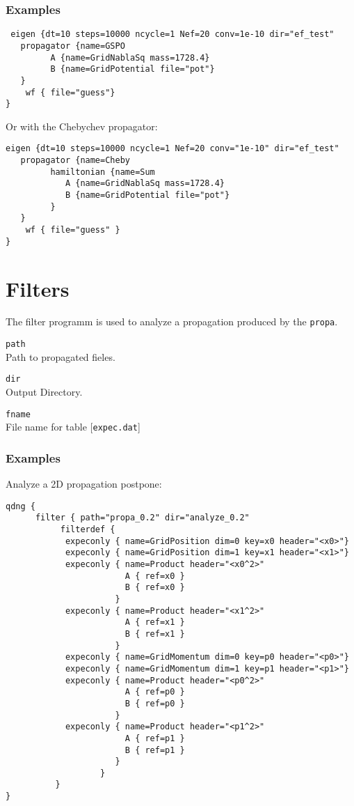 \documentclass[a4paper,12pt]{scrbook}
\newcommand{\option}[2]{\item \texttt{#1}\\ #2}
\newcommand{\code}[1]{\texttt{#1}}
\begin{document}
\subsubsection*{Examples}
\begin{verbatim}
 eigen {dt=10 steps=10000 ncycle=1 Nef=20 conv=1e-10 dir="ef_test"
   propagator {name=GSPO
         A {name=GridNablaSq mass=1728.4}
         B {name=GridPotential file="pot"}
   }
    wf { file="guess"}
}
\end{verbatim}
Or with the Chebychev propagator:
\begin{verbatim}
eigen {dt=10 steps=10000 ncycle=1 Nef=20 conv="1e-10" dir="ef_test"
   propagator {name=Cheby
         hamiltonian {name=Sum
            A {name=GridNablaSq mass=1728.4}
            B {name=GridPotential file="pot"}
         }
   }
    wf { file="guess" }
}
\end{verbatim}


\section{Filters}
The filter programm is used to analyze a propagation produced by the \verb|propa|.
\begin{options}
\option{path}{Path to propagated fieles.}
\option{dir}{Output Directory.}
\option{fname}{File name for table [\code{expec.dat}]}
\end{options}


\subsubsection*{Examples}
Analyze a 2D propagation postpone:
\begin{verbatim}
qdng {
      filter { path="propa_0.2" dir="analyze_0.2"
           filterdef {
            expeconly { name=GridPosition dim=0 key=x0 header="<x0>"}
            expeconly { name=GridPosition dim=1 key=x1 header="<x1>"}
            expeconly { name=Product header="<x0^2>"
                        A { ref=x0 }
                        B { ref=x0 }
                      }
            expeconly { name=Product header="<x1^2>"
                        A { ref=x1 }
                        B { ref=x1 }
                      }
            expeconly { name=GridMomentum dim=0 key=p0 header="<p0>"}
            expeconly { name=GridMomentum dim=1 key=p1 header="<p1>"}
            expeconly { name=Product header="<p0^2>"
                        A { ref=p0 }
                        B { ref=p0 }
                      }
            expeconly { name=Product header="<p1^2>"
                        A { ref=p1 }
                        B { ref=p1 }
                      }
                   }
          }
} 
\end{verbatim}
\end{document}
